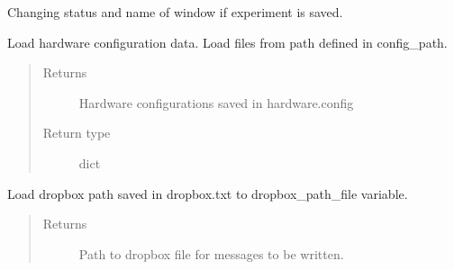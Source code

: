\documentclass[letterpaper,10pt,english]{sphinxmanual}
\begin{document}
\begin{fulllineitems}
\begin{fulllineitems}
\end{fulllineitems}


\begin{fulllineitems}
\label{\detokenize{NoSeMazeController/main:main.MainApp.experiment_saved}}
\pysigstartsignatures
{}
\pysigstopsignatures
\sphinxAtStartPar
Changing status and name of window if experiment is saved.

\end{fulllineitems}


\begin{fulllineitems}
\label{\detokenize{NoSeMazeController/main:main.MainApp.load_config_data}}
\pysigstartsignatures
{}
\pysigstopsignatures
\sphinxAtStartPar
Load hardware configuration data. Load files from path defined in config\_path.
\begin{quote}\begin{description}
\item[{Returns}] \leavevmode
\sphinxAtStartPar
{} \textendash{} Hardware configurations saved in hardware.config

\item[{Return type}] \leavevmode
\sphinxAtStartPar
dict

\end{description}\end{quote}

\end{fulllineitems}


\begin{fulllineitems}
\label{\detokenize{NoSeMazeController/main:main.MainApp.load_dropbox_path}}
\pysigstartsignatures
{}
\pysigstopsignatures
\sphinxAtStartPar
Load dropbox path saved in dropbox.txt to dropbox\_path\_file variable.
\begin{quote}\begin{description}
\item[{Returns}] \leavevmode
\sphinxAtStartPar
{} \textendash{} Path to dropbox file for messages to be written.


\end{description}
\end{quote}
\end{fulllineitems}
\end{fulllineitems}
\end{document}
